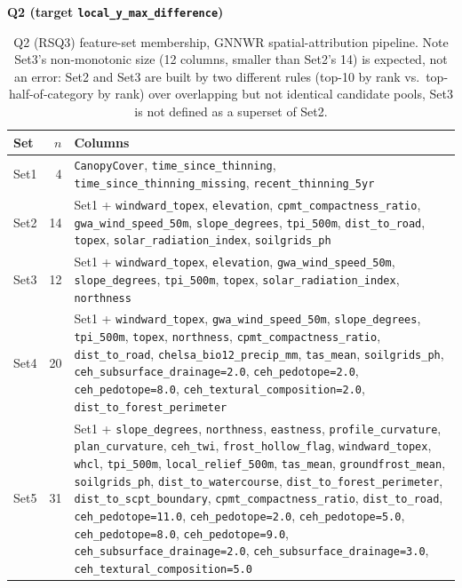 \documentclass[logo,msc,ai]{infthesis}           %
\begin{document}
\begin{table}[H]
\centering
\textbf{Q2 (target \texttt{local\_y\_max\_difference})}\\[4pt]
\scriptsize
\renewcommand{\arraystretch}{1.1}
\begin{tabularx}{\linewidth}{@{} l r >{\raggedright\arraybackslash}X @{}}
\toprule
Set & $n$ & Columns \\
\midrule
Set1 & 4 & \texttt{CanopyCover}, \texttt{time\_since\_thinning}, \texttt{time\_since\_thinning\_missing}, \texttt{recent\_thinning\_5yr} \\
Set2 & 14 & Set1 + \texttt{windward\_topex}, \texttt{elevation}, \texttt{cpmt\_compactness\_ratio}, \texttt{gwa\_wind\_speed\_50m}, \texttt{slope\_degrees}, \texttt{tpi\_500m}, \texttt{dist\_to\_road}, \texttt{topex}, \texttt{solar\_radiation\_index}, \texttt{soilgrids\_ph} \\
Set3 & 12 & Set1 + \texttt{windward\_topex}, \texttt{elevation}, \texttt{gwa\_wind\_speed\_50m}, \texttt{slope\_degrees}, \texttt{tpi\_500m}, \texttt{topex}, \texttt{solar\_radiation\_index}, \texttt{northness} \\
Set4 & 20 & Set1 + \texttt{windward\_topex}, \texttt{gwa\_wind\_speed\_50m}, \texttt{slope\_degrees}, \texttt{tpi\_500m}, \texttt{topex}, \texttt{northness}, \texttt{cpmt\_compactness\_ratio}, \texttt{dist\_to\_road}, \texttt{chelsa\_bio12\_precip\_mm}, \texttt{tas\_mean}, \texttt{soilgrids\_ph}, \texttt{ceh\_subsurface\_drainage=2.0}, \texttt{ceh\_pedotope=2.0}, \texttt{ceh\_pedotope=8.0}, \texttt{ceh\_textural\_composition=2.0}, \texttt{dist\_to\_forest\_perimeter} \\
Set5 & 31 & Set1 + \texttt{slope\_degrees}, \texttt{northness}, \texttt{eastness}, \texttt{profile\_curvature}, \texttt{plan\_curvature}, \texttt{ceh\_twi}, \texttt{frost\_hollow\_flag}, \texttt{windward\_topex}, \texttt{whcl}, \texttt{tpi\_500m}, \texttt{local\_relief\_500m}, \texttt{tas\_mean}, \texttt{groundfrost\_mean}, \texttt{soilgrids\_ph}, \texttt{dist\_to\_watercourse}, \texttt{dist\_to\_forest\_perimeter}, \texttt{dist\_to\_scpt\_boundary}, \texttt{cpmt\_compactness\_ratio}, \texttt{dist\_to\_road}, \texttt{ceh\_pedotope=11.0}, \texttt{ceh\_pedotope=2.0}, \texttt{ceh\_pedotope=5.0}, \texttt{ceh\_pedotope=8.0}, \texttt{ceh\_pedotope=9.0}, \texttt{ceh\_subsurface\_drainage=2.0}, \texttt{ceh\_subsurface\_drainage=3.0}, \texttt{ceh\_textural\_composition=5.0} \\
\bottomrule
\end{tabularx}
\caption{\small{Q2 (RSQ3) feature-set membership, GNNWR spatial-attribution pipeline. Note Set3's non-monotonic size (12 columns, smaller than Set2's 14) is expected, not an error: Set2 and Set3 are built by two different rules (top-10 by rank vs.\ top-half-of-category by rank) over overlapping but not identical candidate pools, Set3 is not defined as a superset of Set2.}}
\label{tab:feature-sets-q2}
\end{table}
\end{document}
